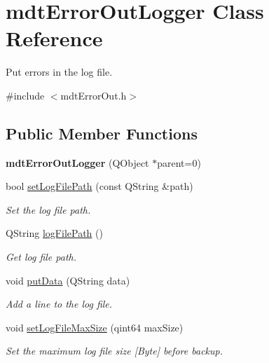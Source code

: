 \hypertarget{classmdt_error_out_logger}{
\section{mdtErrorOutLogger Class Reference}
\label{classmdt_error_out_logger}
}


Put errors in the log file.  




{\ttfamily \#include $<$mdtErrorOut.h$>$}

\subsection*{Public Member Functions}
\begin{DoxyCompactItemize}
\item 
\hypertarget{classmdt_error_out_logger_a323c048fd3a5107e8b28a7c7a9c4cf9d}{
{\bfseries mdtErrorOutLogger} (QObject $\ast$parent=0)}
\label{classmdt_error_out_logger_a323c048fd3a5107e8b28a7c7a9c4cf9d}

\item 
bool \hyperlink{classmdt_error_out_logger_a6e68b905a6c1f9452523b8a0e336ce1e}{setLogFilePath} (const QString \&path)
\begin{DoxyCompactList}\small\item\em Set the log file path. \end{DoxyCompactList}\item 
\hypertarget{classmdt_error_out_logger_ac0d0bcca2d181c722f2ee5d024de5d57}{
QString \hyperlink{classmdt_error_out_logger_ac0d0bcca2d181c722f2ee5d024de5d57}{logFilePath} ()}
\label{classmdt_error_out_logger_ac0d0bcca2d181c722f2ee5d024de5d57}

\begin{DoxyCompactList}\small\item\em Get log file path. \end{DoxyCompactList}\item 
\hypertarget{classmdt_error_out_logger_a4ba2f6f02c9c22171c4d04a8065aafd8}{
void \hyperlink{classmdt_error_out_logger_a4ba2f6f02c9c22171c4d04a8065aafd8}{putData} (QString data)}
\label{classmdt_error_out_logger_a4ba2f6f02c9c22171c4d04a8065aafd8}

\begin{DoxyCompactList}\small\item\em Add a line to the log file. \end{DoxyCompactList}\item 
\hypertarget{classmdt_error_out_logger_a2f7158e61fd961e35f589bb2d1f51e03}{
void \hyperlink{classmdt_error_out_logger_a2f7158e61fd961e35f589bb2d1f51e03}{setLogFileMaxSize} (qint64 maxSize)}
\label{classmdt_error_out_logger_a2f7158e61fd961e35f589bb2d1f51e03}

\begin{DoxyCompactList}\small\item\em Set the maximum log file size \mbox{[}Byte\mbox{]} before backup. \end{DoxyCompactList}\end{DoxyCompactItemize}


